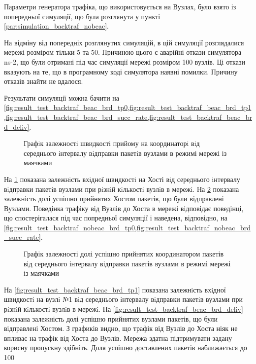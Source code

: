 \documentclass[a4paper,ukrainian,utf8,nocolumnsxix,floatsection,equationsection]{eskdtext}
\newcommand{\longcaption}[1]{\captionsetup{style=figureLongCaption}\caption{#1}}
\begin{document}
Параметри генератора трафіка, що використовується на Вузлах, було взято із попередньої симуляції, що була розглянута у пункті \ref{par:simulation_backtraf_nobeac}.

На відміну від попередніх розглянутих симуляцій, в цій симуляції розглядалися мережі розміром тільки 5 та 50. Причиною цього є аварійні откази симулятора ns-2, що були отримані під час симуляції мережі розміром 100 вузлів. Ці откази вказують на те, що в програмному коді симулятора наявні помилки. Причину отказів знайти не вдалося.

Результати симуляції можна бачити на \cref{fig:result_test_backtraf_beac_brd_tp0,fig:result_test_backtraf_beac_brd_tp1,fig:result_test_backtraf_beac_brd_succ_rate,fig:result_test_backtraf_beac_brd_deliv}.

\begin{figure}[hbp]
	\centering
	\longcaption{\label{fig:result_test_backtraf_beac_brd_tp0}Графiк залежностi швидкостi прийому на координаторi вiд середнього iнтервалу вiдправки пакетiв вузлами в режимі мережі із маячками}
\end{figure}

На \cref{fig:result_test_backtraf_beac_brd_tp0} показана залежнiсть вхiдної швидкостi на Хості вiд середнього iнтервалу вiдправки пакетiв вузлами при рiзнiй кiлькостi вузлiв в мережi. На \cref{fig:result_test_backtraf_beac_brd_succ_rate} показана залежність долі успішно прийнятих Хостом пакетів, що були відправлені Вузлами. Поведінка трафіку від Вузлів до Хоста в мережі відповідає поведінці, що спостерігалася під час попредньої симуляції і наведена, відповідно, на \cref{fig:result_test_backtraf_nobeac_brd_tp0,fig:result_test_backtraf_nobeac_brd_succ_rate}. 

\begin{figure}[hbp]
	\centering
	\caption{\label{fig:result_test_backtraf_beac_brd_succ_rate}Графік залежності долі успішно прийнятих координатором пакетів від середнього інтервалу відправки пакетів вузлами в режимі мережі із маячками}
\end{figure}


На \cref{fig:result_test_backtraf_beac_brd_tp1} показана залежнiсть вхiдної швидкостi на вузлi №1 вiд середнього iнтервалу вiдправки пакетiв вузлами при рiзнiй кiлькостi вузлiв в мережi. На \cref{fig:result_test_backtraf_beac_brd_deliv} показана залежність долі успішно прийнятих вузлами пакетів, що були відправлені Хостом. З графиків видно, що трафік від Вузлів до Хоста ніяк не впливає на трафік від Хоста до Вузлів. Мережа здатна підтримувати задану корисну пропускну здібніть. Доля успішно доставлених пакетів наближається до 100%
\end{document}
